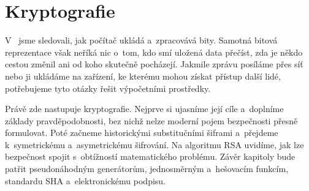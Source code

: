 \chapter{Kryptografie}\label{chap:kryptografie}

V~ jsme sledovali, jak počítač ukládá a~zpracovává bity. Samotná bitová reprezentace však neříká nic o~tom, kdo smí uložená data přečíst, zda je někdo cestou změnil ani od koho skutečně pocházejí. Jakmile zprávu posíláme přes síť nebo ji ukládáme na zařízení, ke kterému mohou získat přístup další lidé, potřebujeme tyto otázky řešit výpočetními prostředky.

Právě zde nastupuje kryptografie. Nejprve si ujasníme její cíle a~doplníme základy pravděpodobnosti, bez nichž nelze moderní pojem bezpečnosti přesně formulovat. Poté začneme historickými substitučními šiframi a~přejdeme k~symetrickému a~asymetrickému šifrování. Na algoritmu RSA uvidíme, jak lze bezpečnost spojit s~obtížností matematického problému. Závěr kapitoly bude patřit pseudonáhodným generátorům, jednosměrným a~hešovacím funkcím, standardu SHA a~elektronickému podpisu.











